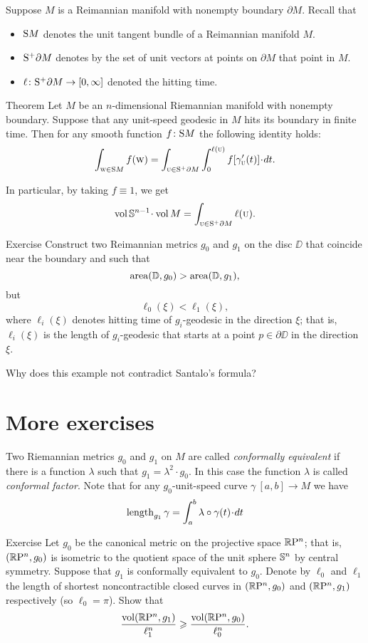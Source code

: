 Suppose $M$ is a Reimannian manifold with nonempty boundary $\partial M$.
Recall that 
\begin{itemize}
\item $\S M$ denotes the unit tangent bundle of a Reimannian manifold $M$.
\item $\S^+ \partial M$ denotes by the set of unit vectors at points on $\partial M$ that point in $M$.
\item $\ell\:\S^+ \partial M\to [0,\infty]$ denoted the hitting time.
\end{itemize}

\begin{thm}{Theorem}
Let $M$ be an $n$-dimensional Riemannian manifold with nonempty boundary.
Suppose that any unit-speed geodesic in $M$ hits its boundary in finite time.
Then for any smooth function $f\:\S M$ the following identity holds:
\[\int_{\vec w\in \S M}f(\vec w)
=
\int_{\vec u\in \S^+ \partial M} 
\int_0^{\ell(\vec u)} f[\gamma'_{\vec u}(t)]\cdot dt.\]

In particular, by taking $f\equiv 1$, we get
\[\vol\SSS^{n-1}\cdot\vol M=\int_{\vec u\in \S^+ \partial M} \ell(\vec u).\]

\end{thm}

\begin{thm}{Exercise}
Construct two Reimannian metrics $g_0$ and $g_1$ on the disc $\DD$ that coincide near the boundary and such that 
\[\area (\DD,g_0)>\area (\DD,g_1),\]
but 
\[\ell_0(\xi)<\ell_1(\xi),\]
where $\ell_i(\xi)$ denotes hitting time of $g_i$-geodesic in the direction $\xi$;
that is, 
$\ell_i(\xi)$ is the length of $g_i$-geodesic that starts at a point $p\in \partial \DD$ in the direction $\xi$.

Why does this example  not contradict Santalo's formula?
\end{thm}

\section{More exercises}

Two Riemannian metrics $g_0$ and $g_1$ on $M$ are called \emph{conformally equivalent} if there is a function $\lambda$ such that $g_1=\lambda^2\cdot g_0$.
In this case the function $\lambda$ is called \emph{conformal factor}.
Note that for any $g_0$-unit-speed curve $\gamma\:[a,b]\to M$ 
we have
\[\length_{g_1}\gamma=\int_a^b\lambda\circ\gamma(t)\cdot dt\]

\begin{thm}{Exercise}
Let $g_0$ be the canonical metric on the projective space $\RP^n$; 
that is, $(\RP^n,g_0)$ is isometric to the quotient space of the unit sphere $\SSS^n$ by central symmetry.
Suppose that $g_1$ is conformally equivalent to $g_0$.
Denote by $\ell_0$ and $\ell_1$ the length of shortest noncontractible closed curves in $(\RP^n,g_0)$ and $(\RP^n,g_1)$ respectively (so $\ell_0=\pi$).
Show that 
\[\frac{\vol(\RP^n,g_1)}{\ell_1^n}\ge \frac{\vol(\RP^n,g_0)}{\ell_0^n}.\]
\end{thm}

